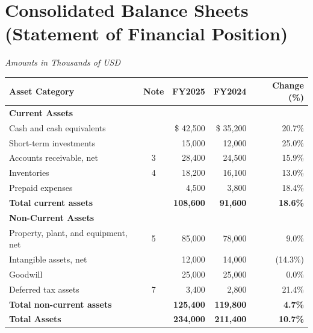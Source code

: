\section*{Consolidated Balance Sheets (Statement of Financial Position)}
\begin{center}
  \small\textit{Amounts in Thousands of USD}
\end{center}
\vspace{10pt}

\noindent
\begin{tabularx}{\textwidth}{L c R R R}
  \textbf{Asset Category} & \textbf{Note} & \textbf{FY2025} & \textbf{FY2024} & \textbf{Change (\%)} \\
  \midrule
  \textbf{Current Assets} & & & & \\
  \quad Cash and cash equivalents & & \$ 42,500 & \$ 35,200 & 20.7\% \\
  \quad Short-term investments & & 15,000 & 12,000 & 25.0\% \\
  \quad Accounts receivable, net & 3 & 28,400 & 24,500 & 15.9\% \\
  \quad Inventories & 4 & 18,200 & 16,100 & 13.0\% \\
  \quad Prepaid expenses & & 4,500 & 3,800 & 18.4\% \\
  \textbf{Total current assets} & & \textbf{108,600} & \textbf{91,600} & \textbf{18.6\%} \\
  \midrule
  \textbf{Non-Current Assets} & & & & \\
  \quad Property, plant, and equipment, net & 5 & 85,000 & 78,000 & 9.0\% \\
  \quad Intangible assets, net & & 12,000 & 14,000 & (14.3\%) \\
  \quad Goodwill & & 25,000 & 25,000 & 0.0\% \\
  \quad Deferred tax assets & 7 & 3,400 & 2,800 & 21.4\% \\
  \textbf{Total non-current assets} & & \textbf{125,400} & \textbf{119,800} & \textbf{4.7\%} \\
  \midrule
  \textbf{Total Assets} & & \textbf{234,000} & \textbf{211,400} & \textbf{10.7\%} \\
  \bottomrule
\end{tabularx}

\vspace{15pt}

